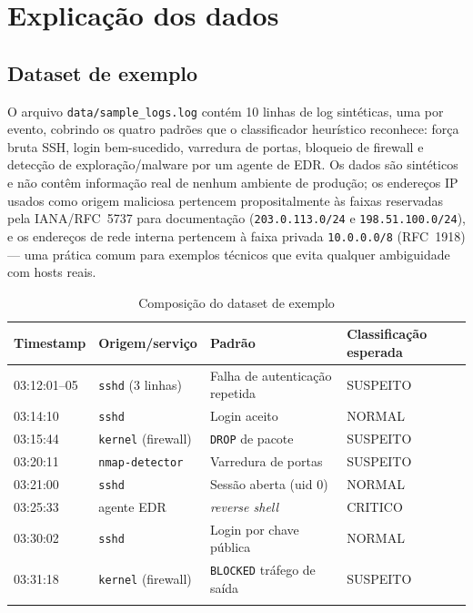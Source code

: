 \documentclass[11pt,a4paper]{article}
\begin{document}
\section{Explicação dos dados}

\subsection{Dataset de exemplo}

O arquivo \texttt{data/sample\_logs.log} contém 10 linhas de log sintéticas, uma por
evento, cobrindo os quatro padrões que o classificador heurístico reconhece: força
bruta SSH, login bem-sucedido, varredura de portas, bloqueio de firewall e detecção de
exploração/malware por um agente de EDR. Os dados são sintéticos e não contêm
informação real de nenhum ambiente de produção; os endereços IP usados como origem
maliciosa pertencem propositalmente às faixas reservadas pela IANA/RFC~5737 para
documentação (\texttt{203.0.113.0/24} e \texttt{198.51.100.0/24}), e os endereços de
rede interna pertencem à faixa privada \texttt{10.0.0.0/8} (RFC~1918) --- uma prática
comum para exemplos técnicos que evita qualquer ambiguidade com hosts reais.

\begin{longtable}{p{1.5cm}p{5cm}p{2.2cm}p{4cm}}
\toprule
\textbf{Timestamp} & \textbf{Origem/serviço} & \textbf{Padrão} & \textbf{Classificação esperada} \\
\midrule
\endhead
03:12:01--05 & \texttt{sshd} (3 linhas) & Falha de autenticação repetida & SUSPEITO \\
03:14:10 & \texttt{sshd} & Login aceito & NORMAL \\
03:15:44 & \texttt{kernel} (firewall) & \texttt{DROP} de pacote & SUSPEITO \\
03:20:11 & \texttt{nmap-detector} & Varredura de portas & SUSPEITO \\
03:21:00 & \texttt{sshd} & Sessão aberta (uid 0) & NORMAL \\
03:25:33 & agente EDR & \emph{reverse shell} & CRITICO \\
03:30:02 & \texttt{sshd} & Login por chave pública & NORMAL \\
03:31:18 & \texttt{kernel} (firewall) & \texttt{BLOCKED} tráfego de saída & SUSPEITO \\
\bottomrule
\caption{Composição do dataset de exemplo}
\end{longtable}
\end{document}
